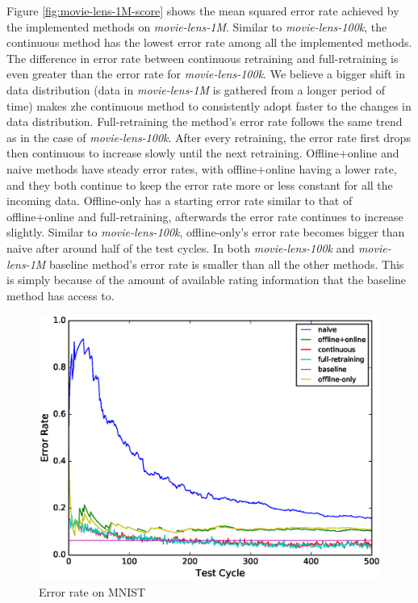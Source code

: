 \documentclass{sig-alternate-05-2015}
\begin{document}
Figure \ref{fig:movie-lens-1M-score} shows the mean squared error rate achieved by the implemented methods on \textit{movie-lens-1M}.
Similar to \textit{movie-lens-100k}, the continuous method has the lowest error rate among all the implemented methods.
The difference in error rate between continuous retraining and full-retraining is even greater than the error rate for \textit{movie-lens-100k}.
We believe a bigger shift in data distribution (data in \textit{movie-lens-1M} is gathered from a longer period of time) makes zhe continuous method to consistently 
adopt faster to the changes in data distribution.
Full-retraining the method's error rate follows the same trend as in the case of \textit{movie-lens-100k}. 
After every retraining, the error rate first drops then continuous to increase slowly until the next retraining.
Offline+online and naive methods have steady error rates, with offline+online having a lower rate, and they both continue to keep the error rate more or less constant for all the incoming data.
Offline-only has a starting error rate similar to that of offline+online and full-retraining, afterwards the error rate continues to increase slightly.
Similar to \textit{movie-lens-100k}, offline-only's error rate becomes bigger than naive after around half of the test cycles.
In both \textit{movie-lens-100k} and \textit{movie-lens-1M} baseline method's error rate is smaller than all the other methods.
This is simply because of the amount of available rating information that the baseline method has access to.

\begin{figure}[h]
 \centering
 \includegraphics[width=\columnwidth]{../images/experiment-results/mnist-quality.eps}
 \caption{Error rate on MNIST}
 \label{fig:mnist-quality}
 \end{figure}
 
\end{document}
